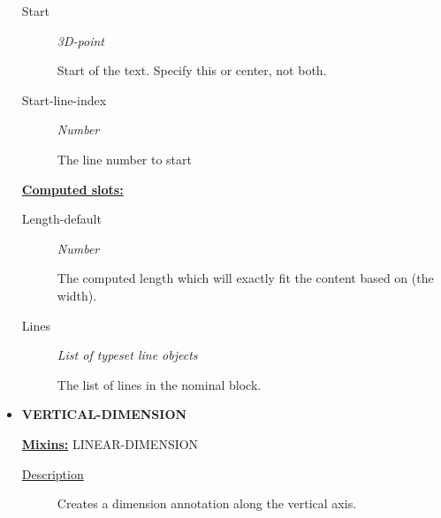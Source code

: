 \documentclass [11pt]{book}
\begin{document}
\begin{itemize}
\begin{description}
\item [Start]
\emph{3D-point}

 Start of the text. Specify this or center, not both.




\item [Start-line-index]
\emph{Number}

 The line number to start




\end{description}






\textbf{
\underline{Computed slots:}}

\begin{description}

\item [Length-default]
\emph{Number}

 The computed length which will exactly fit the content based on (the width).




\item [Lines]
\emph{List of typeset line objects}

 The list of lines in the nominal block.




\end{description}







\item {}
\label{prim:vertical-dimension}
\textbf{VERTICAL-DIMENSION}


\textbf{
\underline{Mixins:}} LINEAR-DIMENSION





\begin{description}

\item [
\underline{Description}]


Creates a dimension annotation along the vertical axis.



\end{description}




\begin{figure}
\begin{lrbox}{\boxedverb}
\begin{minipage}{\linewidth}
{\small

}
\end{minipage}
\end{lrbox}
\end{figure}
\end{itemize}
\end{document}
